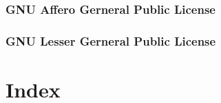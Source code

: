 \documentclass[10pt,a4paper]{book}
\begin{document}
\section{GNU Affero Gerneral Public License}
    \label{agpl}
    

\pagebreak
\section{GNU Lesser Gerneral Public License}
    \label{lgpl}
    

\part{Index}

\label{index}

\printindex[general]
\printindex[dir]
\printindex[sd]
\printindex[fd]
\printindex[console]
\printindex[monitor]
\end{document}
